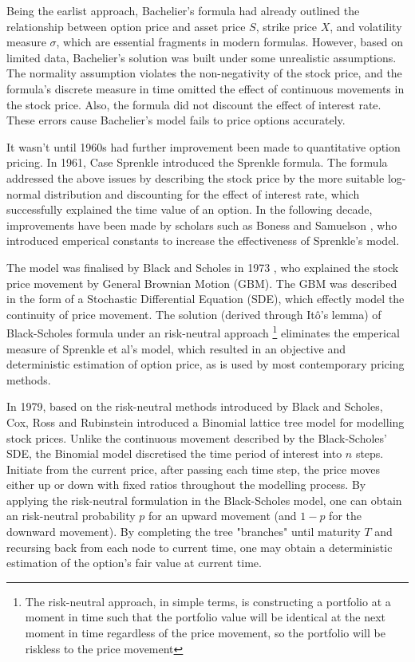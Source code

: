 Being the earlist approach, Bachelier's formula had already outlined the relationship between option price and asset price $S$, strike price $X$, and volatility measure $\sigma$, which are essential fragments in modern formulas. However, based on limited data, Bachelier's solution was built under some unrealistic assumptions. The normality assumption violates the non-negativity of the stock price, and the formula's discrete measure in time omitted the effect of continuous movements in the stock price. Also, the formula did not discount the effect of interest rate. These errors cause Bachelier's model fails to price options accurately.

It wasn't until 1960s had further improvement been made to quantitative option pricing. In 1961, Case Sprenkle \cite{Sprenkle1961} introduced the Sprenkle formula. The formula addressed the above issues by describing the stock price by the more suitable log-normal distribution and discounting for the effect of interest rate, which successfully explained the time value of an option. In the following decade, improvements have been made by scholars such as Boness and Samuelson \cite{BS1973}, who introduced emperical constants to increase the effectiveness of Sprenkle's model.

The model was finalised by Black and Scholes in 1973 \cite{BS1973}, who explained the stock price movement by General Brownian Motion (GBM). The GBM was described in the form of a Stochastic Differential Equation (SDE), which effectly model the continuity of price movement. The solution (derived through Itô's lemma) of Black-Scholes formula under an risk-neutral approach \footnote{The risk-neutral approach, in simple terms, is constructing a portfolio at a moment in time such that the portfolio value will be identical at the next moment in time regardless of the price movement, so the portfolio will be riskless to the price movement} eliminates the emperical measure of Sprenkle et al's model, which resulted in an objective and deterministic estimation of option price, as is used by most contemporary pricing methods.

In 1979, based on the risk-neutral methods introduced by Black and Scholes, Cox, Ross and Rubinstein \cite{CRR1979} introduced a Binomial lattice tree model for modelling stock prices. Unlike the continuous movement described by the Black-Scholes' SDE, the Binomial model discretised the time period of interest into $n$ steps. Initiate from the current price, after passing each time step, the price moves either up or down with fixed ratios throughout the modelling process. By applying the risk-neutral formulation in the Black-Scholes model, one can obtain an risk-neutral probability $p$ for an upward movement (and $1-p$ for the downward movement). By completing the tree "branches" until maturity $T$ and recursing back from each node to current time, one may obtain a deterministic estimation of the option's fair value at current time.

